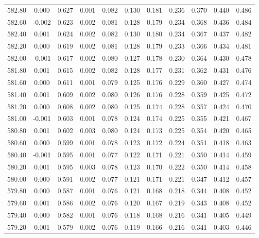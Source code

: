 \begin{longtable}{cccccccccc}
    582.80 &  0.000 &  0.627 &  0.001 &  0.082 &  0.130 &  0.181 &  0.236 &  0.370 &  0.440 &  0.486 \\
    582.60 & -0.002 &  0.623 &  0.002 &  0.081 &  0.128 &  0.179 &  0.234 &  0.368 &  0.436 &  0.484 \\
    582.40 &  0.001 &  0.624 &  0.002 &  0.082 &  0.130 &  0.180 &  0.234 &  0.367 &  0.437 &  0.482 \\
    582.20 &  0.000 &  0.619 &  0.002 &  0.081 &  0.128 &  0.179 &  0.233 &  0.366 &  0.434 &  0.481 \\
    582.00 & -0.001 &  0.617 &  0.002 &  0.080 &  0.127 &  0.178 &  0.230 &  0.364 &  0.430 &  0.478 \\
    581.80 &  0.001 &  0.615 &  0.002 &  0.082 &  0.128 &  0.177 &  0.231 &  0.362 &  0.431 &  0.476 \\
    581.60 &  0.000 &  0.611 &  0.001 &  0.079 &  0.125 &  0.176 &  0.229 &  0.360 &  0.427 &  0.474 \\
    581.40 &  0.001 &  0.609 &  0.002 &  0.080 &  0.126 &  0.176 &  0.228 &  0.359 &  0.425 &  0.472 \\
    581.20 &  0.000 &  0.608 &  0.002 &  0.080 &  0.125 &  0.174 &  0.228 &  0.357 &  0.424 &  0.470 \\
    581.00 & -0.001 &  0.603 &  0.001 &  0.078 &  0.124 &  0.174 &  0.225 &  0.355 &  0.421 &  0.467 \\
    580.80 &  0.001 &  0.602 &  0.003 &  0.080 &  0.124 &  0.173 &  0.225 &  0.354 &  0.420 &  0.465 \\
    580.60 &  0.000 &  0.599 &  0.001 &  0.078 &  0.123 &  0.172 &  0.224 &  0.351 &  0.418 &  0.463 \\
    580.40 & -0.001 &  0.595 &  0.001 &  0.077 &  0.122 &  0.171 &  0.221 &  0.350 &  0.414 &  0.459 \\
    580.20 &  0.001 &  0.595 &  0.003 &  0.078 &  0.123 &  0.170 &  0.222 &  0.350 &  0.414 &  0.458 \\
    580.00 &  0.000 &  0.591 &  0.002 &  0.077 &  0.121 &  0.171 &  0.221 &  0.347 &  0.412 &  0.457 \\
    579.80 &  0.000 &  0.587 &  0.001 &  0.076 &  0.121 &  0.168 &  0.218 &  0.344 &  0.408 &  0.452 \\
    579.60 &  0.001 &  0.586 &  0.002 &  0.076 &  0.120 &  0.167 &  0.219 &  0.343 &  0.408 &  0.452 \\
    579.40 &  0.000 &  0.582 &  0.001 &  0.076 &  0.118 &  0.168 &  0.216 &  0.341 &  0.405 &  0.449 \\
    579.20 &  0.001 &  0.579 &  0.002 &  0.076 &  0.119 &  0.166 &  0.216 &  0.341 &  0.403 &  0.446 \\

\end{longtable}
